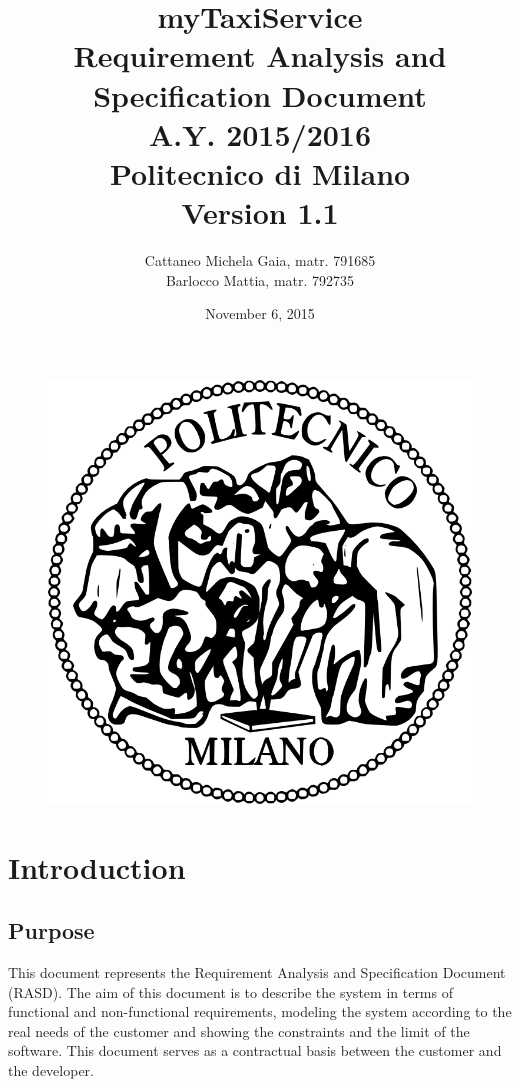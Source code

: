 \documentclass[18pt,oneside,a4paper, titlepage]{article}
\begin{document}
\begin{figure}[t]
	\centering
	\includegraphics[scale=0.35]{logo-polimi.png}
\end{figure}
\title{\textbf{myTaxiService}\\\textbf{R}equirement \textbf{A}nalysis and \textbf{S}pecification \textbf{D}ocument\\ A.Y. 2015/2016\\
	Politecnico di Milano\\ Version 1.1}	
\author{Cattaneo Michela Gaia, matr. 791685\\Barlocco Mattia, matr. 792735 }
\date{November 6, 2015}
\maketitle

\newpage
\tableofcontents

\newpage
\section{Introduction}
	
	\subsection{Purpose}
		This document represents the Requirement Analysis and Specification Document (RASD). The aim of this document is to describe the system in terms of functional and non-functional requirements, modeling the system according to the real needs of the customer and showing the constraints and the limit of the software. This document serves as a contractual basis between the customer and the developer.
	
\end{document}
